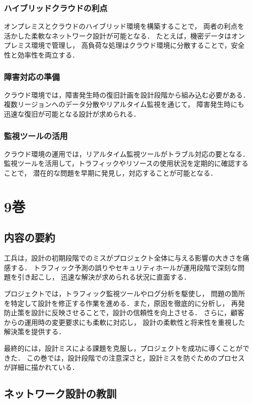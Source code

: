\documentclass[titlepage,a4paper]{jsarticle}
\begin{document}
\subsubsection{ハイブリッドクラウドの利点}
オンプレミスとクラウドのハイブリッド環境を構築することで，
両者の利点を活かした柔軟なネットワーク設計が可能となる．
たとえば，機密データはオンプレミス環境で管理し，
高負荷な処理はクラウド環境に分散することで，安全性と効率性を両立する．

\subsubsection{障害対応の準備}
クラウド環境では，障害発生時の復旧計画を設計段階から組み込む必要がある．
複数リージョンへのデータ分散やリアルタイム監視を通じて，
障害発生時にも迅速な復旧が可能となる設計が求められる．

\subsubsection{監視ツールの活用}
クラウド環境の運用では，リアルタイム監視ツールがトラブル対応の要となる．
監視ツールを活用して，トラフィックやリソースの使用状況を定期的に確認することで，
潜在的な問題を早期に発見し，対応することが可能となる．
\newpage
\section{9巻}
\subsection{内容の要約}
工兵は，設計の初期段階でのミスがプロジェクト全体に与える影響の大きさを痛感する．
トラフィック予測の誤りやセキュリティホールが運用段階で深刻な問題を引き起こし，
迅速な解決が求められる状況に直面する．

プロジェクトでは，トラフィック監視ツールやログ分析を駆使し，
問題の箇所を特定して設計を修正する作業を進める．また，原因を徹底的に分析し，
再発防止策を設計に反映させることで，設計の信頼性を向上させる．
さらに，顧客からの運用時の変更要求にも柔軟に対応し，
設計の柔軟性と将来性を重視した解決策を提供する．

最終的には，設計ミスによる課題を克服し，プロジェクトを成功に導くことができた．
この巻では，設計段階での注意深さと，設計ミスを防ぐためのプロセスが詳細に描かれている．

\subsection{ネットワーク設計の教訓}
\end{document}
